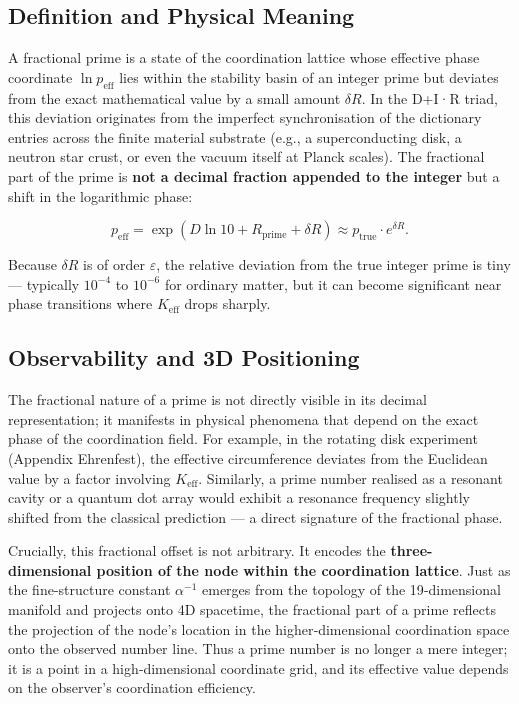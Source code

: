 \documentclass[12pt,a4paper]{article}
\theoremstyle{remark}
\begin{document}
	\subsection{Definition and Physical Meaning}
	
	A fractional prime is a state of the coordination lattice whose effective phase coordinate \(\ln p_{\mathrm{eff}}\) lies within the stability basin of an integer prime but deviates from the exact mathematical value by a small amount \(\delta R\). In the D+I·R triad, this deviation originates from the imperfect synchronisation of the dictionary entries across the finite material substrate (e.g., a superconducting disk, a neutron star crust, or even the vacuum itself at Planck scales). The fractional part of the prime is \textbf{not a decimal fraction appended to the integer} but a shift in the logarithmic phase:
	
	\[
	p_{\mathrm{eff}} = \exp\left(D\ln 10 + R_{\mathrm{prime}} + \delta R\right) \approx p_{\mathrm{true}} \cdot e^{\delta R}.
	\]
	
	Because \(\delta R\) is of order \(\varepsilon\), the relative deviation from the true integer prime is tiny — typically \(10^{-4}\) to \(10^{-6}\) for ordinary matter, but it can become significant near phase transitions where \(K_{\mathrm{eff}}\) drops sharply.
	
	\subsection{Observability and 3D Positioning}
	
	The fractional nature of a prime is not directly visible in its decimal representation; it manifests in physical phenomena that depend on the exact phase of the coordination field. For example, in the rotating disk experiment (Appendix Ehrenfest), the effective circumference deviates from the Euclidean value by a factor involving \(K_{\mathrm{eff}}\). Similarly, a prime number realised as a resonant cavity or a quantum dot array would exhibit a resonance frequency slightly shifted from the classical prediction — a direct signature of the fractional phase.
	
	Crucially, this fractional offset is not arbitrary. It encodes the \textbf{three-dimensional position of the node within the coordination lattice}. Just as the fine-structure constant \(\alpha^{-1}\) emerges from the topology of the 19‑dimensional manifold and projects onto 4D spacetime, the fractional part of a prime reflects the projection of the node’s location in the higher‑dimensional coordination space onto the observed number line. Thus a prime number is no longer a mere integer; it is a point in a high‑dimensional coordinate grid, and its effective value depends on the observer’s coordination efficiency.
	
\end{document}
